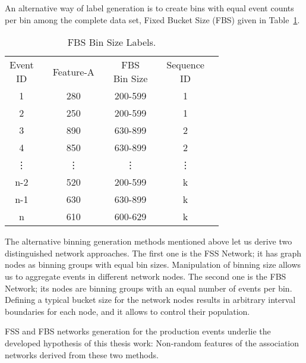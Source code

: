 An alternative way of label generation is to create bins with equal event counts per bin among the complete data set, Fixed Bucket Size (FBS) given in Table~\ref{Tab: D-dataset-FBS}.
\begin{table}[ht!]
	\centering
	\begin{tabular}{|ccccccc|l}
		\cline{1-7}
		\makecell{Event\\ID} 	&& Feature-A    	&& \makecell{FBS\\Bin Size}&& \makecell{Sequence\\ID} &  \\ \cline{1-7}
		1 	      && 280	    && 200-599	&& 1 		   &  \\
		2 		  && 250	    && 200-599	&& 1 		   &  \\
		3 	      && 890	    && 630-899	&& 2 		   &  \\
		4 		  && 850	    && 630-899	&& 2 		   &  \\
		\vdots	  && \vdots  	&& \vdots	&& \vdots 	   &  \\
		n-2 	  && 520	    && 200-599	&& k 		   &  \\
		n-1       && 630	    && 630-899	&& k 		   &  \\
		n 		  && 610	    && 600-629	&& k 		   &  \\ \cline{1-7}
	\end{tabular}
	\caption{FBS Bin Size Labels.}
	\label{Tab: D-dataset-FBS}
\end{table}
The alternative binning generation methods mentioned above let us derive two distinguished network approaches. The first one is the FSS Network; it has graph nodes as binning groups with equal bin sizes. Manipulation of binning size allows us to aggregate events in different network nodes. The second one is the FBS Network; its nodes are binning groups with an equal number of events per bin. Defining a typical bucket size for the network nodes results in arbitrary interval boundaries for each node, and it allows to control their population.


{\color{red}FSS and FBS networks generation for the production events underlie the developed hypothesis of this thesis work: Non-random features of the association networks derived from these two methods.}